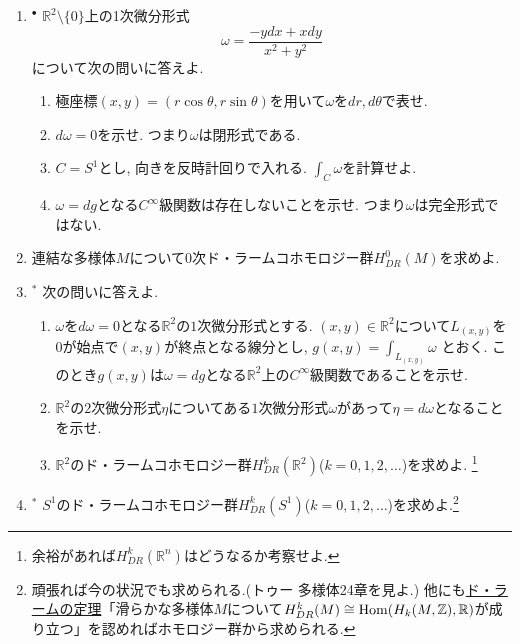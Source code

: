 \documentclass[dvipdfmx,a4paper,11pt]{article}
\newcommand{\R}{\mathbb{R}}
\newcommand{\Z}{\mathbb{Z}}
\theoremstyle{definition}
\begin{document}
\begin{enumerate}[label=\textbf{問}3.\arabic*]
\item $^{\bullet}$ $\R^{2} \setminus \{0\}$上の1次微分形式
$$
\omega = \frac{-ydx + x dy}{x^2+y^2}
$$
について次の問いに答えよ.
\begin{enumerate}
 \setlength{\parskip}{0cm}
  \setlength{\itemsep}{2pt} 
\item 極座標$(x,y)=(r \cos \theta, r \sin \theta)$を用いて$\omega$を$dr,d\theta$で表せ. 
\item $d \omega=0$を示せ. つまり$\omega$は閉形式である. 
\item $C=S^{1}$とし, 向きを反時計回りで入れる. $\int_{C} \omega $を計算せよ. 
\item $\omega = d g$となる$C^{\infty}$級関数は存在しないことを示せ. つまり$\omega$は完全形式ではない. 
\end{enumerate}

\item 連結な多様体$M$について0次ド・ラームコホモロジー群$H^{0}_{DR}(M)$を求めよ. 

\item \label{poincare}  $^{*}$ 次の問いに答えよ.
\begin{enumerate}
\setlength{\parskip}{0cm}
  \setlength{\itemsep}{2pt} 
\item $\omega$を$d \omega=0$となる$\R^2$の$1$次微分形式とする.
$(x,y) \in \R^2$について$L_{(x,y)}$を0が始点で$(x,y) $が終点となる線分とし, 
$
g(x,y) = \int_{L_{(x,y) }} \omega %
$
とおく. このとき$g(x,y)$は$\omega=dg$となる$\R^2$上の$C^{\infty}$級関数であることを示せ. 
\item $\R^2$の$2$次微分形式$\eta$についてある$1$次微分形式$\omega$があって$\eta = d \omega$となることを示せ. 
\item $\R^2$のド・ラームコホモロジー群$H^{k}_{DR}(\R^2)$($k=0,1,2,\ldots$)を求めよ. \footnote{余裕があれば$H^{k}_{DR}(\R^n)$はどうなるか考察せよ. }
\end{enumerate}

\item  $^{*}$ $S^1$のド・ラームコホモロジー群$H^{k}_{DR}(S^1)$($k=0,1,2,\ldots$)を求めよ.\footnote{頑張れば今の状況でも求められる.(トゥー 多様体24章を見よ.) 他にも\underline{ド・ラームの定理}「滑らかな多様体$M$について$H^{k}_{DR}(M) \cong {\rm Hom}(H_{k}(M,\Z), \R)$が成り立つ」を認めればホモロジー群から求められる. }




\end{enumerate}
\end{document}

